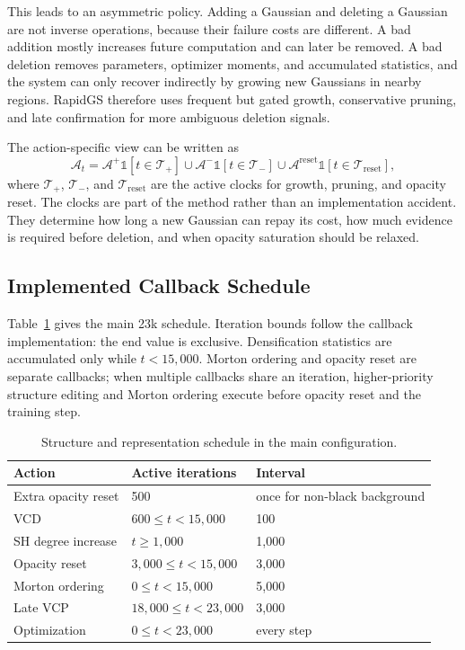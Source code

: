 This leads to an asymmetric policy. Adding a Gaussian and deleting a Gaussian are not inverse operations, because their failure costs are different. A bad addition mostly increases future computation and can later be removed. A bad deletion removes parameters, optimizer moments, and accumulated statistics, and the system can only recover indirectly by growing new Gaussians in nearby regions. RapidGS therefore uses frequent but gated growth, conservative pruning, and late confirmation for more ambiguous deletion signals.

The action-specific view can be written as
\begin{equation}
\mathcal{A}_t
=
\mathcal{A}^{+}\mathbb{1}[t\in\mathcal{T}_{+}]
\cup
\mathcal{A}^{-}\mathbb{1}[t\in\mathcal{T}_{-}]
\cup
\mathcal{A}^{\mathrm{reset}}\mathbb{1}[t\in\mathcal{T}_{\mathrm{reset}}],
\end{equation}
where $\mathcal{T}_{+}$, $\mathcal{T}_{-}$, and $\mathcal{T}_{\mathrm{reset}}$ are the active clocks for growth, pruning, and opacity reset. The clocks are part of the method rather than an implementation accident. They determine how long a new Gaussian can repay its cost, how much evidence is required before deletion, and when opacity saturation should be relaxed.

\subsection{Implemented Callback Schedule}

Table~\ref{tab:method-schedule} gives the main 23k schedule. Iteration bounds follow the callback implementation: the end value is exclusive. Densification statistics are accumulated only while $t<15{,}000$. Morton ordering and opacity reset are separate callbacks; when multiple callbacks share an iteration, higher-priority structure editing and Morton ordering execute before opacity reset and the training step.

\begin{table}[H]
\centering
\caption{Structure and representation schedule in the main configuration.}
\label{tab:method-schedule}
\begin{tabular}{lll}
\toprule
Action & Active iterations & Interval \\
\midrule
Extra opacity reset & 500 & once for non-black background \\
VCD & $600\le t<15{,}000$ & 100 \\
SH degree increase & $t\ge 1{,}000$ & 1,000 \\
Opacity reset & $3{,}000\le t<15{,}000$ & 3,000 \\
Morton ordering & $0\le t<15{,}000$ & 5,000 \\
Late VCP & $18{,}000\le t<23{,}000$ & 3,000 \\
Optimization & $0\le t<23{,}000$ & every step \\
\bottomrule
\end{tabular}
\end{table}

